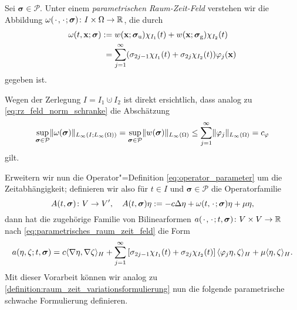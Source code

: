 \begin{Definition}
\label{definition:parametrisches_raum_zeit_feld}
    Sei $\bm\sigma \in \mathcal P$.
    Unter einem \emph{parametrischen Raum-Zeit-Feld} verstehen wir die Abbildung
    $\omega({\mkern2mu\cdot\mkern2mu}, {\mkern2mu\cdot\mkern2mu}; \bm\sigma) \colon I \times \Omega \to \mathbb{R}$, die durch
    \begin{equation}
    \label{eq:parametrisches_raum_zeit_feld}
        \begin{aligned}
            \omega(t, \mathbf{x}; \bm\sigma)
            &:= w(\mathbf{x}; \bm\sigma_{\text{u}}) \chi_{I_{1}}(t) + w(\mathbf{x}; \bm\sigma_{\text{g}}) \chi_{I_{2}}(t)\\
            &\phantom{:}= \sum_{j = 1}^{\infty} (\sigma_{2j-1} \chi_{I_{1}}(t) + \sigma_{2j} \chi_{I_{2}}(t)) \varphi_{j}(\mathbf{x})
        \end{aligned}
    \end{equation}
    gegeben ist.
\end{Definition}

Wegen der Zerlegung $I = I_{1} \cupdot I_{2}$ ist direkt ersichtlich, dass analog zu \cref{eq:rz_feld_norm_schranke} die Abschätzung
\begin{equation}
\label{eq:parametrisches_raum_zeit_feld_schranke}
    \sup_{\bm\sigma \in \mathcal P} \lVert\omega(\bm\sigma)\rVert_{L_{\infty}(I; L_{\infty}(\Omega))}
    = \sup_{\bm\sigma \in \mathcal P} \lVert w(\bm\sigma)\rVert_{L_{\infty}(\Omega)} \leq \sum_{j = 1}^{\infty} \lVert\varphi_{j}\rVert_{L_{\infty}(\Omega)} = c_{\varphi}
\end{equation}
gilt.

Erweitern wir nun die Operator"=Definition \cref{eq:operator_parameter} um die Zeitabhängigkeit; definieren wir also für $t \in I$ und $\bm\sigma \in \mathcal P$ die Operatorfamilie
\begin{equation}
    \label{eq:operator_zeit_parameter}
    A(t, \bm\sigma) \colon V \to V', \quad A(t, \bm\sigma) \eta := -c \Delta \eta + \omega(t, {\mkern2mu\cdot\mkern2mu}; \bm\sigma) \eta + \mu \eta,
\end{equation}
dann hat die zugehörige Familie von Bilinearformen $a({\mkern2mu\cdot\mkern2mu}, {\mkern2mu\cdot\mkern2mu}; t, \bm\sigma) \colon V \times V \to \mathbb{R}$ nach \cref{eq:parametrisches_raum_zeit_feld} die Form
\begin{equation}
    \label{eq:bilinearform_zeit_parameter}
    \begin{aligned}
        a(\eta, \zeta; t, \bm\sigma) = c\langle\nabla \eta,\nabla \zeta\rangle_{H} + \sum_{j = 1}^{\infty} \left[ \sigma_{2j-1} \chi_{I_{1}}(t) + \sigma_{2j} \chi_{I_{2}}(t)  \right] \langle\varphi_{j} \eta,\zeta\rangle_{H} + \mu \langle\eta,\zeta\rangle_{H}.
    \end{aligned}
\end{equation}
Mit dieser Vorarbeit können wir analog zu \cref{definition:raum_zeit_variationsformulierung} nun die folgende parametrische schwache Formulierung definieren.

